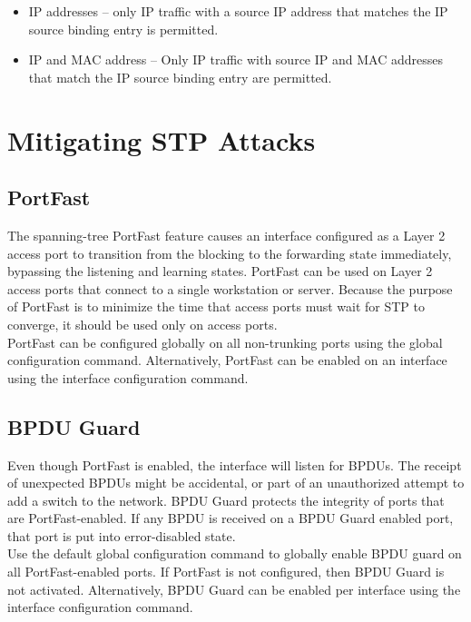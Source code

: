 \begin{itemize}
\item IP addresses -- only IP traffic with a source IP address that matches the IP source binding entry is permitted. 
\item IP and MAC address -- Only IP traffic with source IP and MAC addresses that match the IP source binding entry are permitted.
\end{itemize}

\section{Mitigating STP Attacks}

\subsection{PortFast}

The spanning-tree PortFast feature causes an interface configured as a Layer 2 access port to transition from the blocking to the forwarding state immediately, bypassing the listening and learning states. PortFast can be used on Layer 2 access ports that connect to a single workstation or server. Because the purpose of PortFast is to minimize the time that access ports must wait for STP to converge, it should be used only on access ports. \\

PortFast can be configured globally on all non-trunking ports using the  global configuration command. Alternatively, PortFast can be enabled on an interface using the  interface configuration command.

\subsection{BPDU Guard}

Even though PortFast is enabled, the interface will listen for BPDUs. The receipt of unexpected BPDUs might be accidental, or part of an unauthorized attempt to add a switch to the network. BPDU Guard protects the integrity of ports that are PortFast-enabled. If any BPDU is received on a BPDU Guard enabled port, that port is put into error-disabled state. \\

Use the  default global configuration command to globally enable BPDU guard on all PortFast-enabled ports. If PortFast is not configured, then BPDU Guard is not activated. Alternatively, BPDU Guard can be enabled per interface using the  interface configuration command.

